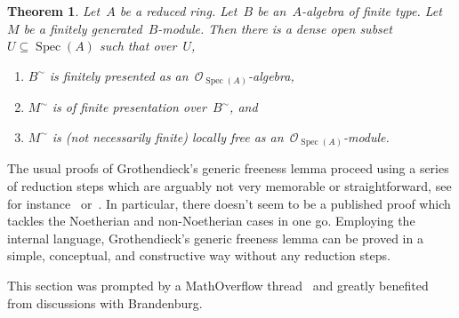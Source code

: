 \documentclass[10pt,reqno,a4paper]{amsbook}
\theoremstyle{definition}
\theoremstyle{plain}
\newtheorem{thm}[defn]{Theorem}
\theoremstyle{remark}
\renewcommand{\O}{\mathcal{O}}
\DeclareMathOperator{\Spec}{Spec}
\newcommand{\?}{\,{:}\,}
\renewcommand{\_}{\mathpunct{.}\,}
\newcommand{\stacksproject}[1]{\cite[{\href{http://stacks.math.columbia.edu/tag/#1}{Tag~#1}}]{stacks-project}}
\begin{document}
\begin{thm}\label{thm:generic-freeness}
Let~$A$ be a reduced ring. Let~$B$ be an~$A$-algebra of finite type.
Let~$M$ be a finitely generated~$B$-module. Then there is a dense open
subset~$U \subseteq \Spec(A)$ such that over~$U$,
\begin{enumerate}
\item $B^\sim$ is finitely presented as an~$\O_{\Spec(A)}$-algebra,
\item $M^\sim$ is of finite presentation over~$B^\sim$, and
\item $M^\sim$ is (not necessarily finite) locally free as an~$\O_{\Spec(A)}$-module.
\end{enumerate}
\end{thm}

The usual proofs of Grothendieck's generic freeness lemma proceed using a series
of reduction steps which are arguably not very memorable or
straightforward, see for instance~\stacksproject{051Q}
or~\cite{staats:generic-freeness}. In particular, there doesn't seem to be a
published proof which tackles the Noetherian and non-Noetherian cases in one go.
Employing the internal language, Grothendieck's generic freeness lemma can be
proved in a simple, conceptual, and constructive way without any reduction steps.

This section was prompted by a MathOverflow thread~\cite{mo:kernel} and
greatly benefited from discussions with Brandenburg.
\end{document}
